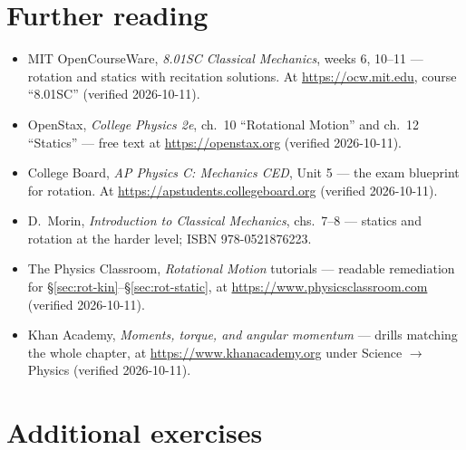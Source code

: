\section*{Further reading}

\begin{itemize}
\item MIT OpenCourseWare, \emph{8.01SC Classical Mechanics}, weeks 6,
10--11 --- rotation and statics with recitation solutions. At
\url{https://ocw.mit.edu}, course ``8.01SC'' (verified 2026-10-11).
\item OpenStax, \emph{College Physics 2e}, ch.~10 ``Rotational Motion''
and ch.~12 ``Statics'' --- free text at \url{https://openstax.org}
(verified 2026-10-11).
\item College Board, \emph{AP Physics C: Mechanics CED}, Unit 5 --- the
exam blueprint for rotation. At \url{https://apstudents.collegeboard.org}
(verified 2026-10-11).
\item D.~Morin, \emph{Introduction to Classical Mechanics}, chs.~7--8 ---
statics and rotation at the harder level; ISBN 978-0521876223.
\item The Physics Classroom, \emph{Rotational Motion} tutorials ---
readable remediation for \S\ref{sec:rot-kin}--\S\ref{sec:rot-static}, at
\url{https://www.physicsclassroom.com} (verified 2026-10-11).
\item Khan Academy, \emph{Moments, torque, and angular momentum} ---
drills matching the whole chapter, at
\url{https://www.khanacademy.org} under Science $\to$ Physics (verified
2026-10-11).
\end{itemize}

\section*{Additional exercises}


